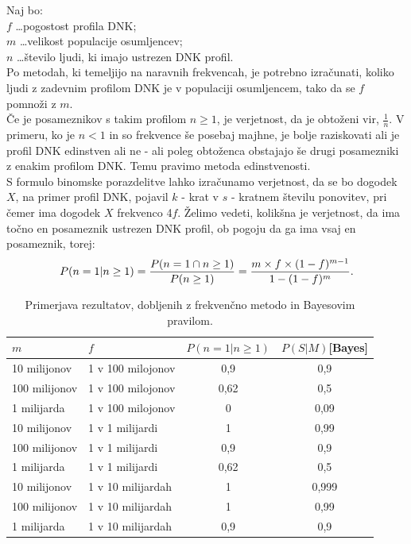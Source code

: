 \documentclass[12pt,a4paper]{amsart}
\theoremstyle{definition} %
\theoremstyle{plain} %
\begin{document}
Naj bo: \\
$f$ \dots pogostost profila DNK;\\
$m$ \dots velikost populacije osumljencev; \\
$n$ \dots število ljudi, ki imajo ustrezen DNK profil. \\
Po metodah, ki temeljijo na naravnih frekvencah, je potrebno izračunati, koliko ljudi z zadevnim profilom DNK je v populaciji osumljencem, tako
da se $f$ pomnoži z $m$.  \\
Če je posameznikov s takim profilom $n \ge 1$, je verjetnost, da je obtoženi vir, $\frac{1}{n}$. V primeru, ko je $n < 1$ in so frekvence še
posebaj majhne, je bolje raziskovati ali je profil DNK edinstven ali ne - ali poleg obtoženca obstajajo še drugi posamezniki z enakim
profilom DNK. Temu pravimo metoda edinstvenosti. \\
S formulo binomske porazdelitve lahko izračunamo verjetnost, da se bo dogodek $X$, na primer profil DNK, pojavil $k$ - krat v $s$ - kratnem
številu ponovitev, pri čemer ima dogodek $X$ frekvenco 4$f$. Želimo vedeti, kolikšna je verjetnost, da ima točno en posameznik ustrezen DNK
profil, ob pogoju da ga ima vsaj en posameznik, torej:
\[
   P(n = 1 \lvert n \ge 1) = \frac{P(n=1 \cap n \ge 1)}{P(n \ge 1)} = \frac{m \times f \times (1 - f)^{m-1}}{1 - (1 - f)^m}. \vspace{2mm}
\]

\begin{table}[h!]
   \centering
   \caption{Primerjava rezultatov, dobljenih z frekvenčno metodo in Bayesovim pravilom.}
   \begin{tabular}{l l c c}
       \hline
       $m$ & $f$ & $P(n = 1 \lvert n \ge 1)$ & $P(S \lvert M)$[Bayes]\\
       \hline
       10 milijonov & 1 v 100 milojonov & 0,9 & 0,9 \\
       100 milijonov & 1 v 100 milojonov & 0,62 & 0,5 \\
       1 milijarda & 1 v 100 milojonov & 0 & 0,09 \\ \hline
       10 milijonov & 1 v 1 milijardi & 1 & 0,99 \\
       100 milijonov & 1 v 1 milijardi & 0,9 & 0,9 \\
       1 milijarda & 1 v 1 milijardi & 0,62 & 0,5 \\ \hline
       10 milijonov & 1 v 10 milijardah & 1 & 0,999 \\
       100 milijonov & 1 v 10 milijardah & 1 & 0,99 \\
       1 milijarda & 1 v 10 milijardah & 0,9 & 0,9 \\ \hline
   \end{tabular}
\end{table}
\end{document}
